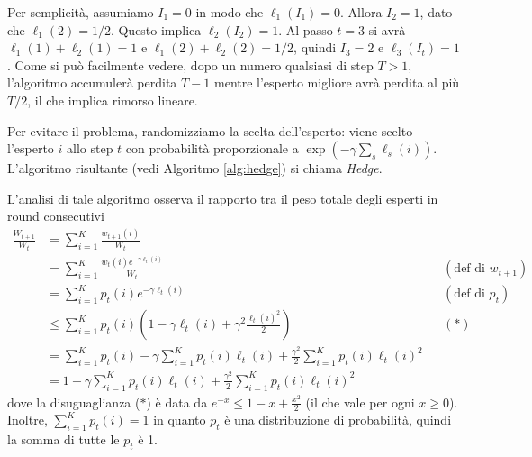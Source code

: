 Per semplicità, assumiamo $I_1 = 0$ in modo che $\ell_1 (I_1) = 0$. Allora $I_2 = 1$, dato che $\ell_1(2) = 1/2$. Questo implica $\ell_2 (I_2) = 1$. Al passo $t = 3$ si avrà $\ell_1(1) + \ell_2(1) = 1$ e $\ell_1(2) + \ell_2(2) = 1/2$, quindi $I_3 = 2$ e $\ell_3(I_t) = 1$. Come si può facilmente vedere, dopo un numero qualsiasi di step $T > 1$, l'algoritmo accumulerà perdita $T - 1$ mentre l'esperto migliore avrà perdita al più $T/2$, il che implica rimorso lineare.

\begin{algorithm}
    \label{alg:hedge}
    \caption{Hedge}
\end{algorithm}

Per evitare il problema, randomizziamo la scelta dell'esperto: viene scelto l'esperto $i$ allo step $t$ con probabilità proporzionale a $\exp \left( - \gamma \sum_s \ell_s (i) \right)$. L'algoritmo risultante (vedi Algoritmo \ref{alg:hedge}) si chiama \textit{Hedge}.

L'analisi di tale algoritmo osserva il rapporto tra il peso totale degli esperti in round consecutivi
\begin{align*}
    \frac{W_{t+1}}{W_t} & = \sum_{i = 1}^K \frac{w_{t+1} (i)}{W_t} \\ 
    & = \sum_{i = 1}^K \frac{w_t (i) e^{-\gamma \ell_t (i)}}{W_t} && (\text{def di } w_{t+1}) \\ 
    & = \sum_{i = 1}^K p_t (i) e^{- \gamma \ell_t (i)} && (\text{def di } p_t) \\
    & \leq \sum_{i = 1}^K p_t (i) \left(1- \gamma \ell_t (i)  + \gamma^2 \frac{\ell_t (i)^2}{2} \right) && (\ast) \\
    & = \sum_{i = 1}^K p_t(i) - \gamma \sum_{i = 1}^K p_t (i) \ell_t (i) + \frac{\gamma^2}{2} \sum_{i = 1}^K p_t (i) \ell_t (i)^2 \\
    & = 1 - \gamma \sum_{i = 1}^K p_t (i) \ell_t (i) + \frac{\gamma^2}{2} \sum_{i = 1}^K p_t (i) \ell_t (i)^2
\end{align*}
dove la disuguaglianza ($\ast$) è data da $e^{-x} \leq 1 - x + \frac{x^2}{2}$ (il che vale per ogni $x \geq 0$). Inoltre, $\sum_{i = 1}^K p_t(i) = 1$ in quanto $p_t$ è una distribuzione di probabilità, quindi la somma di tutte le $p_t$ è 1.

